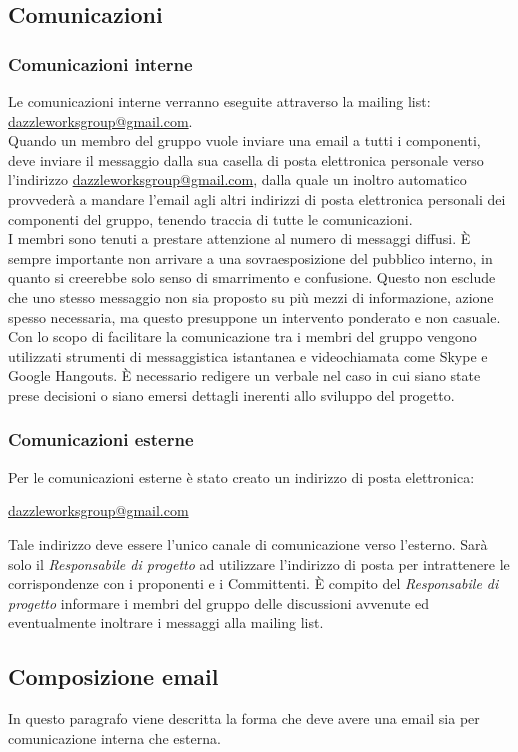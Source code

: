 	\subsection{Comunicazioni}
		\subsubsection{Comunicazioni interne}
Le comunicazioni interne verranno eseguite attraverso la mailing list: \url{dazzleworksgroup@gmail.com}. \\ 
Quando un membro del gruppo vuole inviare una email a tutti i componenti, deve inviare il messaggio dalla sua casella di posta elettronica personale verso l'indirizzo \url{dazzleworksgroup@gmail.com}, dalla quale un inoltro automatico provvederà a mandare l'email agli altri indirizzi di posta elettronica personali dei componenti del gruppo, tenendo traccia di tutte le comunicazioni.\\ 
I membri sono tenuti a prestare attenzione al numero di messaggi diffusi. È sempre importante non arrivare a una sovraesposizione del pubblico interno, in quanto si creerebbe solo senso di smarrimento e confusione. Questo non esclude che uno stesso messaggio non sia proposto su più mezzi di informazione, azione spesso necessaria, ma questo presuppone un intervento ponderato e non casuale.\\
Con lo scopo di facilitare la comunicazione tra i membri del gruppo vengono utilizzati strumenti di messaggistica istantanea e videochiamata come Skype e Google Hangouts.
È necessario redigere un \gls{verbale} nel caso in cui siano state prese decisioni o siano emersi dettagli inerenti allo sviluppo del progetto. 
		\subsubsection{Comunicazioni esterne}
Per le comunicazioni esterne è stato creato un indirizzo di posta elettronica:
\begin{center}
\url{dazzleworksgroup@gmail.com}
\end{center}
Tale indirizzo deve essere l'unico canale di comunicazione verso l'esterno. Sarà solo il \textit{Responsabile di progetto} ad utilizzare l'indirizzo di posta per intrattenere le corrispondenze con i proponenti e i Committenti. È compito del \textit{Responsabile di progetto} informare i membri del gruppo delle discussioni avvenute ed eventualmente inoltrare i messaggi alla mailing list.

	\subsection{Composizione email}
In questo paragrafo viene descritta la forma che deve avere una email sia per comunicazione interna che esterna.
